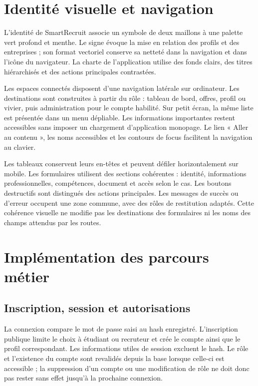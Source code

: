 \section{Identité visuelle et navigation}
L'identité de SmartRecruit associe un symbole de deux maillons à une palette vert profond et menthe. Le signe évoque la mise en relation des profils et des entreprises ; son format vectoriel conserve sa netteté dans la navigation et dans l'icône du navigateur. La charte de l'application utilise des fonds clairs, des titres hiérarchisés et des actions principales contrastées.

Les espaces connectés disposent d'une navigation latérale sur ordinateur. Les destinations sont construites à partir du rôle : tableau de bord, offres, profil ou vivier, puis administration pour le compte habilité. Sur petit écran, la même liste est présentée dans un menu dépliable. Les informations importantes restent accessibles sans imposer un chargement d'application monopage. Le lien « Aller au contenu », les noms accessibles et les contours de focus facilitent la navigation au clavier.

Les tableaux conservent leurs en-têtes et peuvent défiler horizontalement sur mobile. Les formulaires utilisent des sections cohérentes : identité, informations professionnelles, compétences, document et accès selon le cas. Les boutons destructifs sont distingués des actions principales. Les messages de succès ou d'erreur occupent une zone commune, avec des rôles de restitution adaptés. Cette cohérence visuelle ne modifie pas les destinations des formulaires ni les noms des champs attendus par les routes.

\section{Implémentation des parcours métier}
\subsection{Inscription, session et autorisations}
La connexion compare le mot de passe saisi au hash enregistré. L'inscription publique limite le choix à étudiant ou recruteur et crée le compte ainsi que le profil correspondant. Les informations utiles de session excluent le hash. Le rôle et l'existence du compte sont revalidés depuis la base lorsque celle-ci est accessible ; la suppression d'un compte ou une modification de rôle ne doit donc pas rester sans effet jusqu'à la prochaine connexion.

